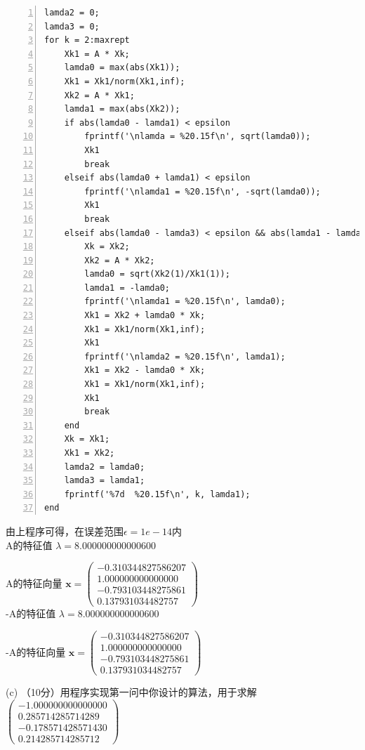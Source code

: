 \documentclass[12pt,a4paper,UTF8]{ctexart}
\begin{document}
\begin{enumerate}
\begin{lstlisting}[frame=single,numbers=left]
lamda2 = 0;
lamda3 = 0;
for k = 2:maxrept
    Xk1 = A * Xk;
    lamda0 = max(abs(Xk1));
    Xk1 = Xk1/norm(Xk1,inf);
    Xk2 = A * Xk1;
    lamda1 = max(abs(Xk2));
    if abs(lamda0 - lamda1) < epsilon
        fprintf('\nlamda = %20.15f\n', sqrt(lamda0));
        Xk1
        break
    elseif abs(lamda0 + lamda1) < epsilon
        fprintf('\nlamda1 = %20.15f\n', -sqrt(lamda0));
        Xk1
        break
    elseif abs(lamda0 - lamda3) < epsilon && abs(lamda1 - lamda2) < epsilon
        Xk = Xk2;
        Xk2 = A * Xk2;
        lamda0 = sqrt(Xk2(1)/Xk1(1));
        lamda1 = -lamda0;
        fprintf('\nlamda1 = %20.15f\n', lamda0);
        Xk1 = Xk2 + lamda0 * Xk;
        Xk1 = Xk1/norm(Xk1,inf);
        Xk1
        fprintf('\nlamda2 = %20.15f\n', lamda1);
        Xk1 = Xk2 - lamda0 * Xk;
        Xk1 = Xk1/norm(Xk1,inf);
        Xk1
        break
    end
    Xk = Xk1;
    Xk1 = Xk2;
    lamda2 = lamda0;
    lamda3 = lamda1;
    fprintf('%7d  %20.15f\n', k, lamda1);
end
	\end{lstlisting}

	由上程序可得，在误差范围$\epsilon = 1e-14$内\\

	A的特征值
	$\lambda = 8.000000000000600$

	A的特征向量
	$	\boldsymbol{x}=\left(\begin{array}{c}
  -0.310344827586207\\
   1.000000000000000\\
  -0.793103448275861\\
   0.137931034482757\end{array}\right)$\\

	-A的特征值
	$\lambda = 8.000000000000600$

	-A的特征向量
	$	\boldsymbol{x}=\left(\begin{array}{c}
  -0.310344827586207\\
   1.000000000000000\\
  -0.793103448275861\\
   0.137931034482757\end{array}\right)$

	(c) （10分）用程序实现第一问中你设计的算法，用于求解
	$\left(\begin{array}{c}
                      -1.000000000000000 \\
                      0.285714285714289  \\
                      -0.178571428571430 \\
                      0.214285714285712
     \end{array}\right)$\\


\end{enumerate}
\end{document}
